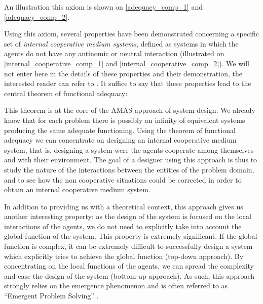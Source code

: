 An illustration this axiom is shown on \figurename{} \ref{adequacy_comp_1} and  \figurename{} \ref{adequacy_comp_2}.



Using this axiom, several properties have been demonstrated concerning a specific set of \emph{internal cooperative medium systems}, defined as systems in which the agents do not have any antinomic or neutral interaction (illustrated on \figurename{} \ref{internal_cooperative_comp_1} and \figurename{} \ref{internal_cooperative_comp_2}). We will not enter here in the details of these properties and their demonstration, the interested reader can refer to \cite{glize2001adaptation, gleizes1999theory}. It suffice to say that these properties lead to the central theorem of functional adequacy:


This theorem is at the core of the AMAS approach of system design. We already know that for each problem there is possibly an infinity of equivalent systems producing the same adequate functioning. Using the theorem of functional adequacy we can concentrate on designing an internal cooperative medium system, that is, designing a system were the agents cooperate among themselves and with their environment. The goal of a designer using this approach is thus to study the nature of the interactions between the entities of the problem domain, and to see how the non cooperative situations could be corrected in order to obtain an internal cooperative medium system.

In addition to providing us with a theoretical context, this approach gives us another interesting property: as the design of the system is focused on the local interactions of the agents, we do not need to explicitly take into account the global function of the system. This property is extremely significant. If the global function is complex, it can be extremely difficult to successfully design a system which explicitly tries to achieve the global function (top-down approach). By concentrating on the local functions of the agents, we can spread the complexity and ease the design of the system (bottom-up approach). As such, this approach strongly relies on the emergence phenomenon and is often referred to as \enquote{Emergent Problem Solving} \cite{quinqueton2000emergent}.

